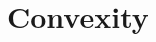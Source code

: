 \documentclass[english,reprint, aps, prl,superscriptaddress, showpacs,
showkeys, longbibliography, amsmath, amssymb]{revtex4-1}
\theoremstyle{plain}
\theoremstyle{definition}
\newcommand{\events}{\ensuremath{\mathcal{E}}}
\newcommand{\imposs}{{\text{\wesa{impossible}}}}
\newcommand{\necess}{{\text{\wesa{certain}}}}
\begin{document}

\section{Convexity}
\end{document}
